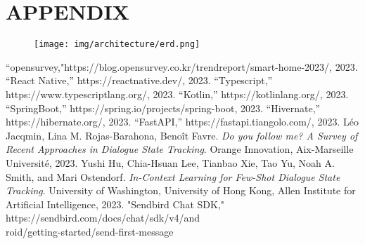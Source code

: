 \documentclass[conference]{IEEEtran}
\begin{document}
\clearpage

\section{APPENDIX}

\begin{figure}[H]
    \hspace*{-8cm}
    \texttt{[image: img/architecture/erd.png]}
    \label{fig:erd}
\end{figure}

\clearpage

\begin{thebibliography}{9}
“opensurvey,"https://blog.opensurvey.co.kr/trendreport/smart-home-2023/, 2023.
  “React Native,” https://reactnative.dev/, 2023.
  “Typescript,” https://www.typescriptlang.org/, 2023.
  “Kotlin,” https://kotlinlang.org/, 2023.
  “SpringBoot,” https://spring.io/projects/spring-boot, 2023.
  “Hivernate,” https://hibernate.org/, 2023.
 “FastAPI,” https://fastapi.tiangolo.com/, 2023.
L{\'e}o Jacqmin, Lina M. Rojas-Barahona, Beno{\^i}t Favre.
\textit{Do you follow me? A Survey of Recent Approaches in Dialogue State Tracking}. 
Orange Innovation, Aix-Marseille Universit{\'e}, 2023.
Yushi Hu, Chia-Hsuan Lee, Tianbao Xie, Tao Yu, Noah A. Smith, and Mari Ostendorf.
\textit{In-Context Learning for Few-Shot Dialogue State Tracking}.
University of Washington, University of Hong Kong, Allen Institute for Artificial Intelligence, 2023.
 "Sendbird Chat SDK,"
https://sendbird.com/docs/chat/sdk/v4/and\\roid/getting-started/send-first-message


\end{thebibliography}
\end{document}
